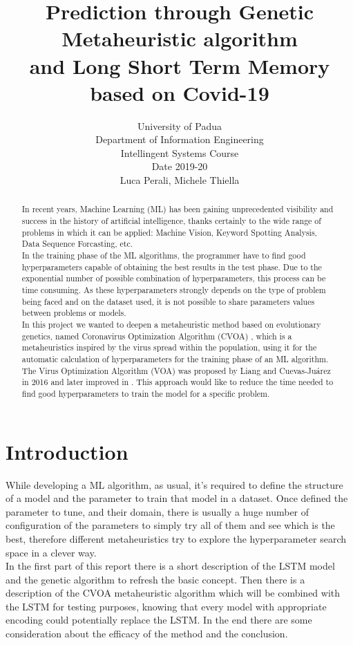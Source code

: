 \documentclass[letterpaper]{article}%
\title{Prediction through Genetic Metaheuristic algorithm \\ and Long Short Term Memory based on Covid-19}
\author{ University of Padua \\ Department of Information Engineering \\ Intellingent Systems Course \\ Date 2019-20 \\ %
Luca Perali, Michele Thiella
}
\begin{document}
\maketitle

\begin{abstract}
	In recent years, Machine Learning (ML) has been gaining unprecedented visibility and success in the history of artificial intelligence, thanks certainly to the wide range of problems in which it can be applied: Machine Vision, Keyword Spotting Analysis, Data Sequence Forcasting, etc. \\
	In the training phase of the ML algorithms, the programmer have to find good hyperparameters capable of obtaining the best results in the test phase. Due to the exponential number of possible combination of hyperparameters, this process can be time consuming. As these hyperparameters strongly depends on the type of problem being faced and on the dataset used, it is not possible to share parameters values between problems or models. \\
	In this project we wanted to deepen a metaheuristic method based on evolutionary genetics, named Coronavirus Optimization Algorithm (CVOA) \cite{martnezlvarez2020coronavirus}, which is a metaheuristics inspired by the virus spread within the population, using it for the automatic calculation of hyperparameters for the training phase of an ML algorithm. The Virus Optimization Algorithm (VOA) was proposed by Liang and Cuevas-Juárez in 2016 \cite{LiangYun-ChiaJuarezJosue} and later improved in \cite{Liang2020}. This approach would like to reduce the time needed to find good hyperparameters to train the model for a specific problem.
	
\end{abstract}

\section{Introduction}
	While developing a ML algorithm, as usual, it's required to define the structure of a model and the parameter to train that model in a dataset. Once defined the parameter to tune, and their domain, there is usually a huge number of configuration of the parameters to simply try all of them and see which is the best, therefore different metaheuristics try to explore the hyperparameter search space in a clever way. \\
	In the first part of this report there is a short description of the LSTM model and the genetic algorithm to refresh the basic concept. Then there is a description of the CVOA metaheuristic algorithm which will be combined with the LSTM for testing purposes, knowing that every model with appropriate encoding could potentially replace the LSTM. In the end there are some consideration about the efficacy of the method and the conclusion. 
	
\end{document}

